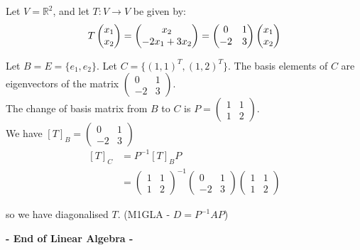 \begin{example} Let $V = \mathbb{R}^2$, and let $T: V \to V$ be given by:
\[
T\Spvek{x_1;x_2} = 
\Spvek[c]{x_2; -2x_1 + 3x_2}
= 
\begin{pmatrix}
0 & 1 \\ -2 & 3
\end{pmatrix}
\Spvek{x_1;x_2}
\]

Let $B = E = \{e_1,e_2\}$. Let $C = \{(1,1)^T,(1,2)^T\}$. The basis elements of $C$ are eigenvectors of the matrix $\begin{pmatrix}
0 & 1 \\ -2 & 3
\end{pmatrix}$. \\

The change of basis matrix from $B$ to $C$ is $P = \begin{pmatrix}
 1 & 1\\ 1 & 2
 \end{pmatrix}$.\\
 
 We have $[T]_B = \begin{pmatrix}
 0 & 1 \\ -2 & 3
 \end{pmatrix}$\\
 
 \[
 \begin{aligned}
 [T]_C &= P^{-1}[T]_BP\\
 &= \begin{pmatrix}
 1 & 1 \\ 1 & 2
 \end{pmatrix}^{-1}
 \begin{pmatrix}
 0 & 1 \\ -2 & 3
 \end{pmatrix}
\begin{pmatrix}
 1 & 1\\ 1 & 2
 \end{pmatrix}
 \end{aligned}\]
 
 so we have diagonalised $T$. (M1GLA - $D = P^{-1}AP$)
 \end{example}
 
 
\begin{center}
  
  \textsf{\textbf{- End of Linear Algebra -}}	
  \end{center}




